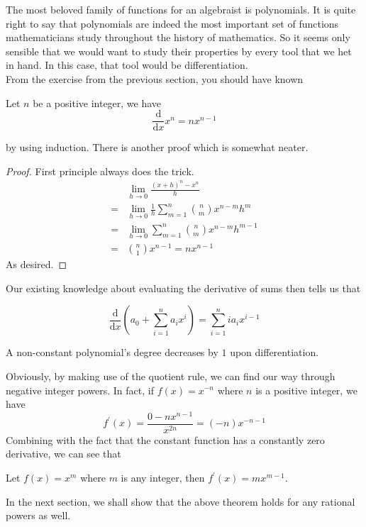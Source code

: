 The most beloved family of functions for an algebraist is polynomials.
It is quite right to say that polynomials are indeed the most important set of functions mathematicians study throughout the history of mathematics.
So it seems only sensible that we would want to study their properties by every tool that we het in hand.
In this case, that tool would be differentiation.\\
From the exercise from the previous section, you should have known
\begin{theorem}
    Let $n$ be a positive integer, we have
    $$\frac{\mathrm d}{\mathrm dx}x^n=nx^{n-1}$$
\end{theorem}
by using induction.
There is another proof which is somewhat neater.
\begin{proof}
    First principle always does the trick.
    \begin{align*}
        &\lim_{h\to0}\frac{(x+h)^n-x^n}{h}\\
        =&\lim_{h\to0}\frac{1}{h}\sum_{m=1}^n\binom{n}{m}x^{n-m}h^m\\
        =&\lim_{h\to0}\sum_{m=1}^n\binom{n}{m}x^{n-m}h^{m-1}\\
        =&\binom{n}{1}x^{n-1}=nx^{n-1}
    \end{align*}
    As desired.
\end{proof}
Our existing knowledge about evaluating the derivative of sums then tells us that
\begin{theorem}
    $$\frac{\mathrm d}{\mathrm dx}\left(a_0+\sum_{i=1}^{n}a_ix^i\right)=\sum_{i=1}^{n}ia_ix^{i-1}$$
\end{theorem}
\begin{corollary}
    A non-constant polynomial's degree decreases by $1$ upon differentiation.
\end{corollary}
Obviously, by making use of the quotient rule, we can find our way through negative integer powers.
In fact, if $f(x)=x^{-n}$ where $n$ is a positive integer, we have
$$f^\prime(x)=\frac{0-nx^{n-1}}{x^{2n}}=(-n)x^{-n-1}$$
Combining with the fact that the constant function has a constantly zero derivative, we can see that
\begin{theorem}
    Let $f(x)=x^m$ where $m$ is any integer, then $f^\prime(x)=mx^{m-1}$.
\end{theorem}
In the next section, we shall show that the above theorem holds for any rational powers as well.